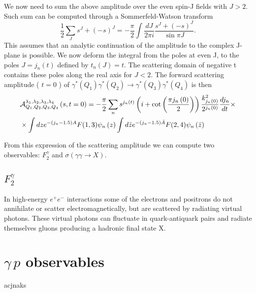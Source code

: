 \documentclass[preprint, 12pt]{elsarticle}
\begin{document}
We now need to sum the above amplitude over the even spin-J fields with $J>2$. Such sum can be computed through a Sommerfeld-Watson transform
\begin{equation}
\frac{1}{2} \sum_J s^J + (-s)^J = -\frac{\pi}{2} \int \frac{dJ}{2 \pi i} \frac{s^J + (-s)^J}{\sin \pi J}.
\end{equation}
This assumes that an analytic continuation of the amplitude to the complex J-plane is possible. We now deform the integral from the poles at even J, to the poles $J = j_n\left(t\right)$ defined by $t_n(J) = t$. The scattering domain of negative t contains these poles along the real axis for $J<2$. The forward scattering amplitude ( $t= 0$ ) of $\gamma^{*}\left(Q_1\right)\gamma^{*}\left(Q_2\right) \rightarrow \gamma^{*}\left(Q_3\right) \gamma^{*}\left(Q_4\right)$ is then
\begin{align}
&\mathcal{A}^{\lambda_1, \lambda_2, \lambda_3, \lambda_4}_{Q_1, Q_2, Q_3, Q_4}\left(s,t = 0\right) = - \frac{\pi}{2} \sum_n s^{j_n\left(t\right)} \left( i + \cot\left(\frac{\pi j_n\left(0\right)}{2}\right) \right) \frac{k_{j_n\left(0\right)}^2}{2^{j_n\left(0\right)}} \frac{d j_n}{dt} \times \notag \\
& \times \int dz e^{-(j_n - 1.5) A} F(1,3) \psi_n\left(z\right) \int d\bar{z} e^{-(j_n-1.5)\bar{A}} F(2,4) \psi_n\left(\bar{z}\right)
\label{eq:scattering_amplitude}
\end{align}

From this expression of the scattering amplitude we can compute two observables: $F_2^\gamma$ and $\sigma\left(\gamma \gamma \rightarrow X\right)$.
\subsection{$F_2^\gamma$}
In high-energy $e^{+}e^{-}$ interactions some of the electrons and positrons do not annihilate or scatter electromagnetically, but are scattered by radiating virtual photons. These virtual photons can fluctuate in quark-antiquark pairs and radiate themselves gluons producing a hadronic final state X.




\section{$\gamma\, p$ observables}

acjnaks

































\end{document}
